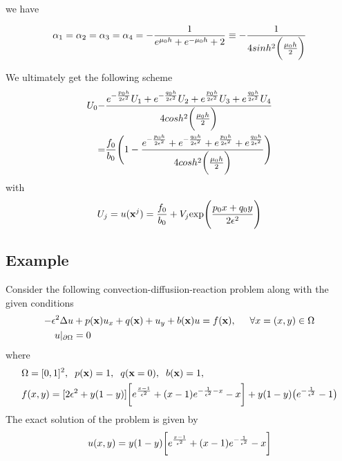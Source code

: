 we have

\begin{align}
 \alpha_{1} = \alpha_{2}=\alpha_{3} = \alpha_{4} = -\frac{1}{e^{\mu_{0}h}+e^{-\mu_{0}h}+2} \equiv - \frac{1}{4 sinh^{2}\bigg{(}\frac{\mu_{0}h}{2}\bigg{)}}
\end{align}

We ultimately get the following scheme
\begin{align}
 \begin{split}
  U_{0} -& \frac{e^{-\frac{p_{0}h}{2\epsilon^2}}U_{1}+e^{-\frac{q_{0}h}{2\epsilon^2}}U_{2}+e^{\frac{p_{0}h}{2\epsilon^2}}U_{3}+e^{\frac{q_{0}h}{2\epsilon^2}}U_{4}}
  {4cosh^2\bigg{(}\frac{\mu_{0}h}{2}\bigg{)}}\\
  =& \frac{f_{0}}{b_{0}}\Bigg{(}1-\frac{e^{-\frac{p_{0}h}{2\epsilon^2}}+e^{-\frac{q_{0}h}{2\epsilon^2}}+e^{\frac{p_{0}h}{2\epsilon^2}}+e^{\frac{q_{0}h}{2\epsilon^2}}}
  {4cosh^2\bigg{(}\frac{\mu_{0}h}{2}\bigg{)}}\Bigg{)}
 \end{split}
\end{align}
with
\begin{align}
U_{j} = u(\textbf{x}^{j}) = \frac{f_{0}}{b_{0}} + V_{j}\text{exp}\Bigg{(} \frac{p_{0}x + q_{0}y}{2 \epsilon ^2} \Bigg{)}
\end{align}

\subsection{Example}
Consider the following convection-diffusiion-reaction problem along with the given conditions
\begin{align}
 -\epsilon^{2}\Delta u &+ p(\textbf{x})u_{x} + q(\textbf{x})+u_{y}+b(\textbf{x})u = f(\textbf{x}),\hspace{0.5cm} \forall x = (x,y) \in \Omega\\
 u|_{\partial{\Omega}} &= 0
\end{align}
where
\begin{align*}
 &\Omega = [0,1]^2,\hspace{2mm} p(\textbf{x}) = 1,\hspace{2mm} q(\textbf{x}=0),\hspace{2mm} b(\textbf{x}) = 1,\\
 &f(x,y) = [2\epsilon^2 + y(1-y)]\bigg{[}e^{\frac{x-1}{\epsilon^2}} + (x-1)e^{-\frac{1}{\epsilon^2}-x} -x\bigg{]} + y(1-y)\big{(}e^{-\frac{1}{\epsilon^2}}-1\big{)}
\end{align*}
The exact solution of the problem is given by
\begin{align*}
 u(x,y) = y(1-y)\bigg{[}e^{\frac{x-1}{\epsilon^2}} + (x-1)e^{-\frac{1}{\epsilon^2}} -x \bigg{]} 
\end{align*}

